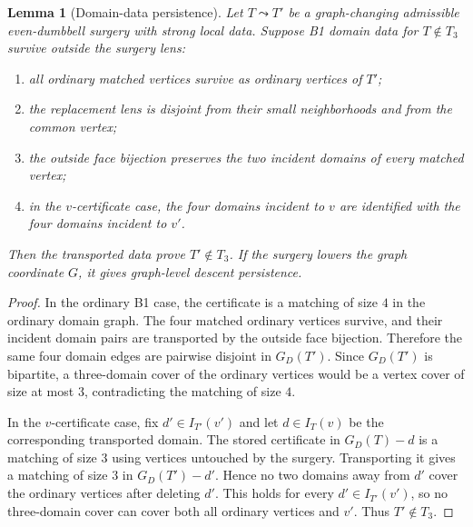 \documentclass[11pt]{amsart}
\newtheorem{lemma}[theorem]{Lemma}
\theoremstyle{definition}
\begin{document}
\begin{lemma}[Domain-data persistence]
Let \(T\leadsto T'\) be a graph-changing
admissible even-dumbbell surgery with strong local data. Suppose B1 domain data
for \(T\notin T_3\) survive outside the surgery lens:

\begin{enumerate}
\item all ordinary matched vertices survive as ordinary vertices of \(T'\);
\item the replacement lens is disjoint from their small neighborhoods and from the common vertex;
\item the outside face bijection preserves the two incident domains of every matched vertex;
\item in the \(v\)-certificate case, the four domains incident to \(v\) are identified with the four domains incident to \(v'\).
\end{enumerate}

Then the transported data prove \(T'\notin T_3\). If the surgery lowers the graph
coordinate \(G\), it gives graph-level descent persistence.

\end{lemma}
\begin{proof}
In the ordinary B1 case, the certificate is a matching of size \(4\) in the ordinary domain graph. The four matched ordinary vertices survive, and their incident domain pairs are transported by the outside face bijection. Therefore the same four domain edges are pairwise disjoint in \(G_D(T')\). Since \(G_D(T')\) is bipartite, a three-domain cover of the ordinary vertices would be a vertex cover of size at most \(3\), contradicting the matching of size \(4\).

In the \(v\)-certificate case, fix \(d'\in I_{T'}(v')\) and let \(d\in I_T(v)\) be the corresponding transported domain. The stored certificate in \(G_D(T)-d\) is a matching of size \(3\) using vertices untouched by the surgery. Transporting it gives a matching of size \(3\) in \(G_D(T')-d'\). Hence no two domains away from \(d'\) cover the ordinary vertices after deleting \(d'\). This holds for every \(d'\in I_{T'}(v')\), so no three-domain cover can cover both all ordinary vertices and \(v'\). Thus \(T'\notin T_3\).

\end{proof}
\end{document}
